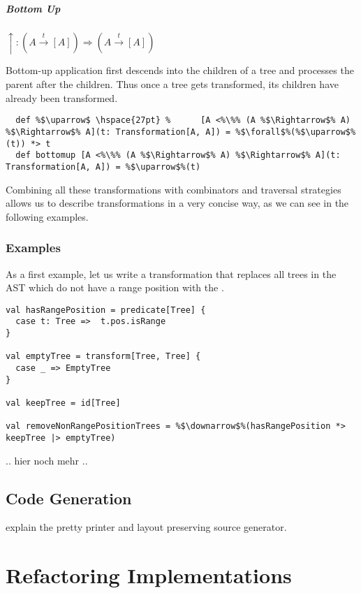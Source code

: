 \documentclass[10pt,a4paper,oneside]{scrreprt}
\begin{document}
\paragraph{Bottom Up} \hfill $\uparrow: (A \overset{t}{\rightarrow} [A]) \Rightarrow (A \overset{t}{\rightarrow} [A])$

\vspace{7pt} Bottom-up application first descends into the children of a tree and processes the parent after the children. Thus once a tree gets transformed, its children have already been transformed.

\begin{lstlisting}
  def %$\uparrow$ \hspace{27pt} %      [A <%\%% (A %$\Rightarrow$% A) %$\Rightarrow$% A](t: Transformation[A, A]) = %$\forall$%(%$\uparrow$%(t)) *> t
  def bottomup [A <%\%% (A %$\Rightarrow$% A) %$\Rightarrow$% A](t: Transformation[A, A]) = %$\uparrow$%(t)
\end{lstlisting}

Combining all these transformations with combinators and traversal strategies allows us to describe transformations in a very concise way, as we can see in the following examples.

\subsection{Examples}

As a first example, let us write a transformation that replaces all trees in the AST which do not have a range position with the .

\begin{lstlisting}
val hasRangePosition = predicate[Tree] {
  case t: Tree =>  t.pos.isRange
}

val emptyTree = transform[Tree, Tree] {
  case _ => EmptyTree
}

val keepTree = id[Tree]

val removeNonRangePositionTrees = %$\downarrow$%(hasRangePosition *> keepTree |> emptyTree)
\end{lstlisting}

.. hier noch mehr ..


\section{Code Generation}
explain the pretty printer and layout preserving source generator.


\chapter{Refactoring Implementations}
\end{document}
